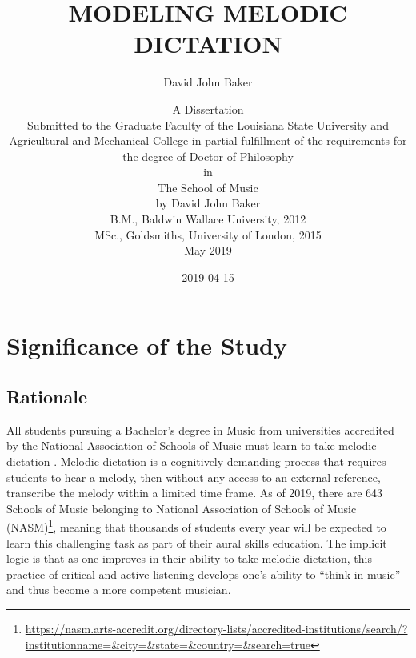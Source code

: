 \documentclass[12pt,]{book}
\title{MODELING MELODIC DICTATION}
\subtitle{David John Baker}
\author{A Dissertation \\ Submitted to the Graduate Faculty of the Louisiana State University and Agricultural and Mechanical College in partial fulfillment of the requirements for the degree of Doctor of Philosophy \\ in \\ The School of Music \\ by David John Baker \\ B.M., Baldwin Wallace University, 2012 \\ MSc., Goldsmiths, University of London, 2015 \\ May 2019}
\date{2019-04-15}
\let\rmarkdownfootnote\footnote%
\def\footnote{\protect\rmarkdownfootnote}
\begin{document}
\maketitle

{
\setcounter{tocdepth}{1}
\tableofcontents
}
\listoftables
\listoffigures
\hypertarget{significance-of-the-study}{%
\chapter{Significance of the Study}\label{significance-of-the-study}}

\hypertarget{rationale}{%
\section{Rationale}\label{rationale}}

All students pursuing a Bachelor's degree in Music from universities accredited by the National Association of Schools of Music must learn to take melodic dictation \citep[§VIII.6.B.2.A]{nasmNationalAssociationSchools2019}.
Melodic dictation is a cognitively demanding process that requires students to hear a melody, then without any access to an external reference, transcribe the melody within a limited time frame.
As of 2019, there are 643 Schools of Music belonging to National Association of Schools of Music (NASM)\footnote{\url{https://nasm.arts-accredit.org/directory-lists/accredited-institutions/search/?institutionname=\&city=\&state=\&country=\&search=true}}, meaning that thousands of students every year will be expected to learn this challenging task as part of their aural skills education.
The implicit logic is that as one improves in their ability to take melodic dictation, this practice of critical and active listening develops one's ability to ``think in music'' \citep{bestMusicCurriculaFuture1992, karpinskiAuralSkillsAcquisition2000} and thus become a more competent musician.
\end{document}
